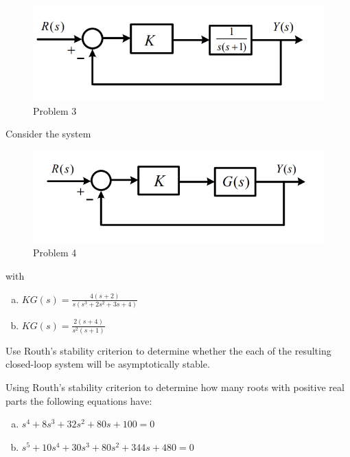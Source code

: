 \documentclass[11pt]{article}
\begin{document}
\begin{figure}[h] 
    \centering
    \includegraphics[width=0.55 \linewidth]{prob3}
    \caption{Problem 3}
    \label{fig:p3}
\end{figure}

\soln









Consider the system
\begin{figure}[h] 
    \centering
    \includegraphics[width=0.55 \linewidth]{prob4}
    \caption{Problem 4}
    \label{fig:p4}
\end{figure}

with \begin{enumerate}[a)]
    \item $KG(s) = \frac{4(s+2)}{s(s^3+2s^2+3s+4)}$
    \item $KG(s) = \frac{2(s+4)}{s^2(s+1)}$
\end{enumerate}

Use Routh's stability criterion to determine whether the each of the resulting closed-loop
system will be asymptotically stable.

\soln







Using Routh's stability criterion to determine how many roots with positive
real parts the following equations have: 

\begin{enumerate}[a)]
    \item $s^4 + 8s^3 + 32s^2 + 80s + 100 = 0$
    \item $s^5 + 10s^4 + 30s^3 + 80s^2 + 344s + 480 = 0$
\end{enumerate}

\soln
\end{document}
